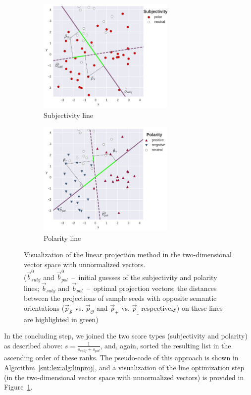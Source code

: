 \begin{figure}[hbt!]
  \centering
  \begin{subfigure}{.45\textwidth}
    \centering
    \mbox{\includegraphics[height=15em]{img/sentilex_subjectivity}}
    \caption{Subjectivity line}
  \end{subfigure}
  \begin{subfigure}{.45\textwidth}
    \centering
    \mbox{\includegraphics[height=15em]{img/sentilex_polarity}}
    \caption{Polarity line}
  \end{subfigure}
  \caption[Visualization of the linear projection method in the
  two-dimensional vector space.]{Visualization of the linear
    projection method in the
    two-dimensional vector space with unnormalized vectors.\\
    (\small $\vec{b}^0_{subj}$ and $\vec{b}^0_{pol}$~--~initial
    guesses of the subjectivity and polarity lines; $\vec{b}_{subj}$
    and $\vec{b}_{pol}$~--~optimal projection vectors; the distances
    between the projections of sample seeds with opposite semantic
    orientations ($\vec{p}_{\mathcal{S}}$ vs. $\vec{p}_{\mathcal{O}}$
    and $\vec{p}_+$ vs. $\vec{p}_\_$ respectively) on these lines are
    highlighted in \textcolor{highlighter green}{green})}
  \label{fig:linproj}
\end{figure}

In the concluding step, we joined the two score types (subjectivity
and polarity) as described above: $s = \frac{1}{s_{subj} + s_{pol}}$,
and, again, sorted the resulting list in the ascending order of these
ranks.  The pseudo-code of this approach is shown in
Algorithm~\ref{snt:lex:alg:linproj}, and a visualization of the line
optimization step (in the two-dimensional vector space with
unnormalized vectors) is provided in Figure~\ref{fig:linproj}.

